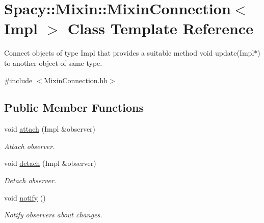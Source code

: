 \hypertarget{classSpacy_1_1Mixin_1_1MixinConnection}{\section{Spacy\-:\-:Mixin\-:\-:Mixin\-Connection$<$ Impl $>$ Class Template Reference}
\label{classSpacy_1_1Mixin_1_1MixinConnection}
}


Connect objects of type Impl that provides a suitable method void update(\-Impl$\ast$) to another object of same type.  




{\ttfamily \#include $<$Mixin\-Connection.\-hh$>$}

\subsection*{Public Member Functions}
\begin{DoxyCompactItemize}
\item 
\hypertarget{classSpacy_1_1Mixin_1_1MixinConnection_abb5520ee6b22dd993d78f142939a1ed4}{void \hyperlink{classSpacy_1_1Mixin_1_1MixinConnection_abb5520ee6b22dd993d78f142939a1ed4}{attach} (Impl \&observer)}\label{classSpacy_1_1Mixin_1_1MixinConnection_abb5520ee6b22dd993d78f142939a1ed4}

\begin{DoxyCompactList}\small\item\em Attach observer. \end{DoxyCompactList}\item 
\hypertarget{classSpacy_1_1Mixin_1_1MixinConnection_adda739590c487679c26f60e50aedb73f}{void \hyperlink{classSpacy_1_1Mixin_1_1MixinConnection_adda739590c487679c26f60e50aedb73f}{detach} (Impl \&observer)}\label{classSpacy_1_1Mixin_1_1MixinConnection_adda739590c487679c26f60e50aedb73f}

\begin{DoxyCompactList}\small\item\em Detach observer. \end{DoxyCompactList}\item 
\hypertarget{classSpacy_1_1Mixin_1_1MixinConnection_a1ddeaa78a3bb4a38c2cca36d1f99fe36}{void \hyperlink{classSpacy_1_1Mixin_1_1MixinConnection_a1ddeaa78a3bb4a38c2cca36d1f99fe36}{notify} ()}\label{classSpacy_1_1Mixin_1_1MixinConnection_a1ddeaa78a3bb4a38c2cca36d1f99fe36}

\begin{DoxyCompactList}\small\item\em Notify observers about changes. \end{DoxyCompactList}\end{DoxyCompactItemize}


